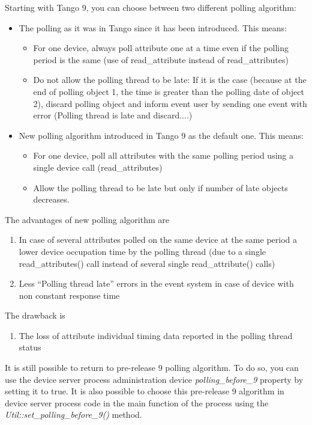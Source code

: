 Starting with Tango 9, you can choose between two different polling
algorithm:
\begin{itemize}
\item The polling as it was in Tango since it has been introduced. This
means:

\begin{itemize}
\item For one device, always poll attribute one at a time even if the polling
period is the same (use of read\_attribute instead of read\_attributes)
\item Do not allow the polling thread to be late: If it is the case (because
at the end of polling object 1, the time is greater than the polling
date of object 2), discard polling object and inform event user by
sending one event with error (Polling thread is late and discard....)
\end{itemize}
\item New polling algorithm introduced in Tango 9 as the default one. This
means:

\begin{itemize}
\item For one device, poll all attributes with the same polling period using
a single device call (read\_attributes)
\item Allow the polling thread to be late but only if number of late objects
decreases.
\end{itemize}
\end{itemize}
The advantages of new polling algorithm are 
\begin{enumerate}
\item In case of several attributes polled on the same device at the same
period a lower device occupation time by the polling thread (due to
a single read\_attributes() call instead of several single read\_attribute()
calls)
\item Less ``Polling thread late'' errors in the event system in case
of device with non constant response time
\end{enumerate}
The drawback is
\begin{enumerate}
\item The loss of attribute individual timing data reported in the polling
thread status
\end{enumerate}
It is still possible to return to pre-release 9 polling algorithm.
To do so, you can use the device server process administration device
\emph{polling\_before\_9}
property by setting it to true. It is also possible to choose this
pre-release 9 algorithm in device server process code in the main
function of the process using the \emph{Util::set\_polling\_before\_9()}
method.

